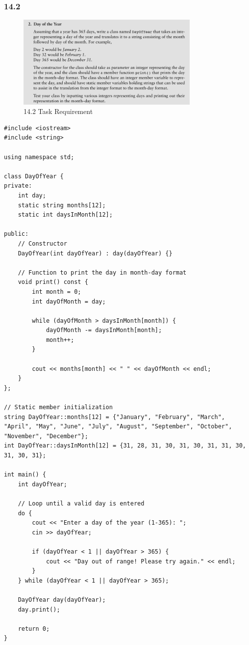 \documentclass{article}
\begin{document}
\subsubsection*{14.2}

\begin{figure}[H]
    \centering
    \includegraphics[width=0.8\textwidth]{./Assets/Task requirements/Assignment11/14.2.png}
    \caption{14.2 Task Requirement}
\end{figure}

\begin{lstlisting}[caption=DayOfYear.cpp]
#include <iostream>
#include <string>

using namespace std;

class DayOfYear {
private:
    int day;
    static string months[12];
    static int daysInMonth[12];

public:
    // Constructor
    DayOfYear(int dayOfYear) : day(dayOfYear) {}

    // Function to print the day in month-day format
    void print() const {
        int month = 0;
        int dayOfMonth = day;

        while (dayOfMonth > daysInMonth[month]) {
            dayOfMonth -= daysInMonth[month];
            month++;
        }

        cout << months[month] << " " << dayOfMonth << endl;
    }
};

// Static member initialization
string DayOfYear::months[12] = {"January", "February", "March", "April", "May", "June", "July", "August", "September", "October", "November", "December"};
int DayOfYear::daysInMonth[12] = {31, 28, 31, 30, 31, 30, 31, 31, 30, 31, 30, 31};

int main() {
    int dayOfYear;

    // Loop until a valid day is entered
    do {
        cout << "Enter a day of the year (1-365): ";
        cin >> dayOfYear;

        if (dayOfYear < 1 || dayOfYear > 365) {
            cout << "Day out of range! Please try again." << endl;
        }
    } while (dayOfYear < 1 || dayOfYear > 365);

    DayOfYear day(dayOfYear);
    day.print();

    return 0;
}
\end{lstlisting}
\end{document}
